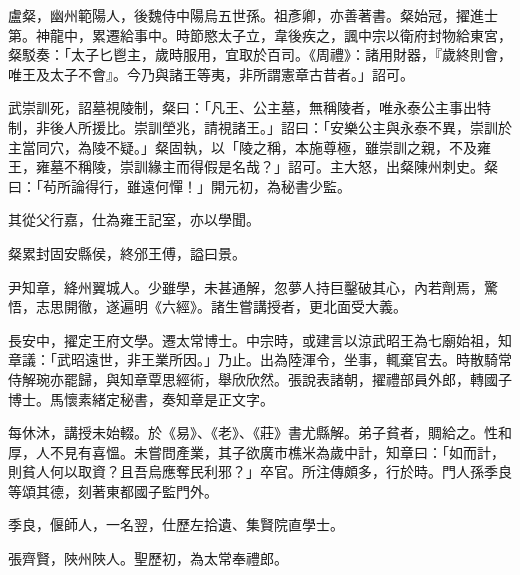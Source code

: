 \begin{pinyinscope}
 盧粲，幽州範陽人，後魏侍中陽烏五世孫。祖彥卿，亦善著書。粲始冠，擢進士第。神龍中，累遷給事中。時節愍太子立，韋後疾之，諷中宗以衛府封物給東宮，粲駁奏：「太子匕鬯主，歲時服用，宜取於百司。《周禮》：諸用財器，『歲終則會，唯王及太子不會』。今乃與諸王等夷，非所謂憲章古昔者。」詔可。



 武崇訓死，詔墓視陵制，粲曰：「凡王、公主墓，無稱陵者，唯永泰公主事出特制，非後人所援比。崇訓塋兆，請視諸王。」詔曰：「安樂公主與永泰不異，崇訓於主當同穴，為陵不疑。」粲固執，以「陵之稱，本施尊極，雖崇訓之親，不及雍王，雍墓不稱陵，崇訓緣主而得假是名哉？」詔可。主大怒，出粲陳州刺史。粲曰：「茍所論得行，雖遠何憚！」開元初，為秘書少監。



 其從父行嘉，仕為雍王記室，亦以學聞。



 粲累封固安縣侯，終邠王傅，謚曰景。



 尹知章，絳州翼城人。少雖學，未甚通解，忽夢人持巨鑿破其心，內若劑焉，驚悟，志思開徹，遂遍明《六經》。諸生嘗講授者，更北面受大義。



 長安中，擢定王府文學。遷太常博士。中宗時，或建言以涼武昭王為七廟始祖，知章議：「武昭遠世，非王業所因。」乃止。出為陸渾令，坐事，輒棄官去。時散騎常侍解琬亦罷歸，與知章覃思經術，舉欣欣然。張說表諸朝，擢禮部員外郎，轉國子博士。馬懷素緒定秘書，奏知章是正文字。



 每休沐，講授未始輟。於《易》、《老》、《莊》書尤縣解。弟子貧者，賙給之。性和厚，人不見有喜慍。未嘗問產業，其子欲廣市樵米為歲中計，知章曰：「如而計，則貧人何以取資？且吾烏應奪民利邪？」卒官。所注傳頗多，行於時。門人孫季良等頌其德，刻著東都國子監門外。



 季良，偃師人，一名翌，仕歷左拾遺、集賢院直學士。



 張齊賢，陜州陜人。聖歷初，為太常奉禮郎。




\end{pinyinscope}
